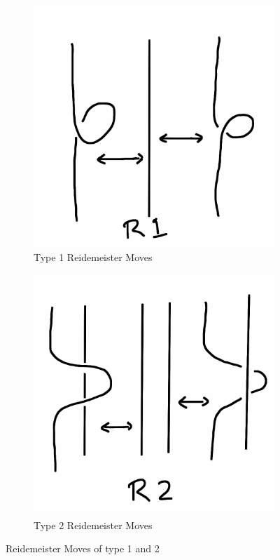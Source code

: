 \documentclass[12pt,letterpaper]{article}
\theoremstyle{definition}
\begin{document}
\begin{figure}[h]
    \centering
    \begin{subfigure}{.25\textwidth}
        \centering
        \includegraphics[width=\textwidth]{knotpics/r1.png}
        \caption{Type 1 Reidemeister Moves}
    \end{subfigure}
    \hspace{1in}
    \begin{subfigure}{.25\textwidth}
        \centering
        \includegraphics[width=\textwidth]{knotpics/r2.png}
        \caption{Type 2 Reidemeister Moves}
    \end{subfigure}
    \caption{Reidemeister Moves of type 1 and 2}
\end{figure}
\end{document}
